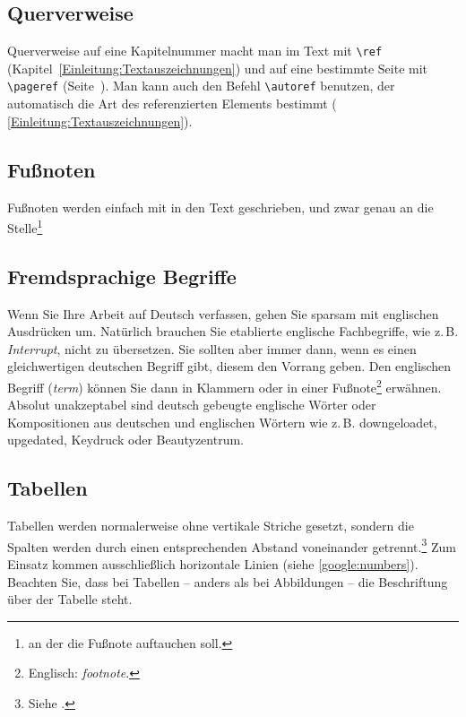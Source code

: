 \documentclass[conference,compsoc,final,a4paper]{IEEEtran}
\begin{document}
\subsection{Querverweise}
Querverweise auf eine Kapitelnummer macht man im Text mit \lstinline+\ref+ (Kapitel~\ref{Einleitung:Textauszeichnungen}) und auf eine bestimmte Seite mit \lstinline+\pageref+ (Seite~\pageref{Einleitung:Textauszeichnungen}). Man kann auch den Befehl \lstinline+\autoref+ benutzen, der automatisch die Art des referenzierten Elements bestimmt (\zb{} \autoref{Einleitung:Textauszeichnungen}).

\subsection{Fußnoten}
Fußnoten werden einfach mit in den Text geschrieben, und zwar genau an die Stelle\footnote{an der die Fußnote auftauchen soll.}

\subsection{Fremdsprachige Begriffe}
Wenn Sie Ihre Arbeit auf Deutsch verfassen, gehen Sie sparsam mit englischen Ausdrücken um. Natürlich brauchen Sie etablierte englische Fachbegriffe, wie z.\,B. \textit{Interrupt}, nicht zu übersetzen. Sie sollten aber immer dann, wenn es einen gleichwertigen deutschen Begriff gibt, diesem den Vorrang geben. Den englischen Begriff (\textit{term}) können Sie dann in Klammern oder in einer Fußnote\footnote{Englisch: \textit{footnote}.} erwähnen. Absolut unakzeptabel sind deutsch gebeugte englische Wörter oder Kompositionen aus deutschen und englischen Wörtern wie z.\,B. downgeloadet, upgedated, Keydruck oder Beautyzentrum.

\subsection{Tabellen}
Tabellen werden normalerweise ohne vertikale Striche gesetzt, sondern die Spalten werden durch einen entsprechenden Abstand voneinander getrennt.\footnote{Siehe \cite[S. 89]{Willberg1999}.} Zum Einsatz kommen ausschließlich horizontale Linien (siehe \autoref{google:numbers}). Beachten Sie, dass bei Tabellen -- anders als bei Abbildungen -- die Beschriftung über der Tabelle steht.
\end{document}
